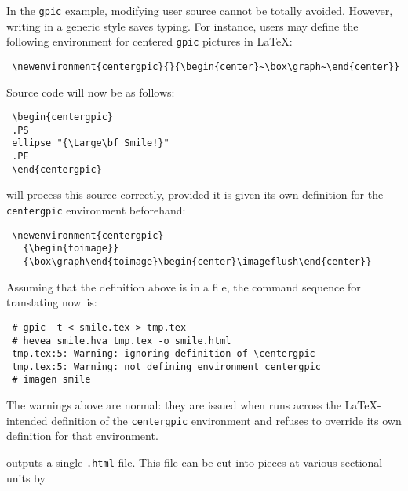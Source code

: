 In the \texttt{gpic} example, modifying user source cannot be totally avoided.
However, writing in a generic style saves typing.
For instance, users may define the following environment for
centered \texttt{gpic} pictures in \LaTeX{}:
\begin{verbatim}
 \newenvironment{centergpic}{}{\begin{center}~\box\graph~\end{center}}
\end{verbatim}
Source code will now be as follows:
\begin{verbatim}
 \begin{centergpic}
 .PS
 ellipse "{\Large\bf Smile!}"
 .PE
 \end{centergpic}
\end{verbatim}
\hevea{} will process this source correctly, provided it is given its
own definition for the \verb+centergpic+ environment beforehand:
\begin{verbatim}
 \newenvironment{centergpic}
   {\begin{toimage}}
   {\box\graph\end{toimage}\begin{center}\imageflush\end{center}}
\end{verbatim}
Assuming that the definition above is in a  file,
the command sequence for translating
 \mbox{now is}:
\begin{verbatim}
 # gpic -t < smile.tex > tmp.tex
 # hevea smile.hva tmp.tex -o smile.html
 tmp.tex:5: Warning: ignoring definition of \centergpic
 tmp.tex:5: Warning: not defining environment centergpic
 # imagen smile
\end{verbatim}
The warnings above are normal: they are issued when \hevea{} runs
across the \LaTeX{}-intended definition of the \verb+centergpic+
environment and refuses to override its own definition for that
environment.


\hevea{} outputs a single \texttt{.html} file. This file can be
cut into pieces at various sectional units by {\hacha}

